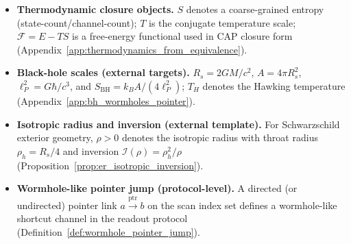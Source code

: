\begin{itemize}
\item \textbf{Thermodynamic closure objects.}
$S$ denotes a coarse-grained entropy (state-count/channel-count); $T$ is the conjugate temperature scale; $\mathcal{F}=E-TS$ is a free-energy functional used in CAP closure form (Appendix~\ref{app:thermodynamics_from_equivalence}).
\item \textbf{Black-hole scales (external targets).}
$R_s=2GM/c^2$, $A=4\pi R_s^2$, $\ell_P^2=G\hbar/c^3$, and $S_{\mathrm{BH}}=k_BA/(4\ell_P^2)$; $T_H$ denotes the Hawking temperature (Appendix~\ref{app:bh_wormholes_pointer}).
\item \textbf{Isotropic radius and inversion (external template).}
For Schwarzschild exterior geometry, $\rho>0$ denotes the isotropic radius with throat radius $\rho_h=R_s/4$ and inversion $\mathcal{I}(\rho)=\rho_h^2/\rho$ (Proposition~\ref{prop:er_isotropic_inversion}).
\item \textbf{Wormhole-like pointer jump (protocol-level).}
A directed (or undirected) pointer link $a\xrightarrow{\mathrm{ptr}}b$ on the scan index set defines a wormhole-like shortcut channel in the readout protocol (Definition~\ref{def:wormhole_pointer_jump}).
\end{itemize}


